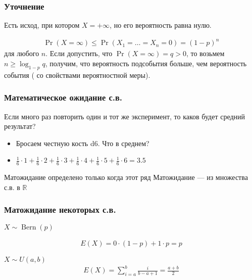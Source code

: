 \documentclass[hyperref=unicode,graphics=pdflatex,13pt,xcolor={usenames,dvipsnames}]{beamer}
\renewcommand\emph[1]{{\color{blue}{#1}}}
\newcommand\R{\mathbb{R}}
\DeclareMathOperator{\Bern}{Bern}
\begin{document}
\begin{frame}
  \frametitle{Уточнение}

  Есть исход, при котором $X = +\infty$, но его вероятность равна нулю.

  \begin{align*}
    \Pr(X = \infty) \le \Pr(X_1 = \dots = X_n = 0) = (1 - p)^n
  \end{align*}
  для любого $n$. Если допустить, что $\Pr(X = \infty) = q > 0$, то возьмем $n \ge \log_{1 - p} q$, получим, что вероятность подсобытия больше, чем вероятность события (\emph{Противоречие} со свойствами вероятностной меры).  
\end{frame}

\begin{frame}
  \frametitle{Математическое ожидание с.в.}

  Если много раз повторить один и тот же эксперимент, то каков будет средний результат?

  \begin{itemize}
    \item Бросаем честную кость d6. Что в среднем?
    \item $\frac{1}{6} \cdot 1 + \frac{1}{6} \cdot 2 + \frac{1}{6} \cdot 3 + \frac{1}{6} \cdot 4 + \frac{1}{6} \cdot 5 + \frac{1}{6} \cdot 6 = 3.5$
  \end{itemize}

  \pause

  \begin{center}
  \end{center}

  \pause
  \emph{NB:} Матожидание определено только когда этот ряд \emph{абсолютно сходится}
  \emph{NB-2:} Матожидание --- \emph{оператор} из множества с.в. в $\R$
\end{frame}

\begin{frame}
  \frametitle{Матожидание некоторых с.в.}

  $X \sim \Bern(p)$
  
  \begin{align*}
    E(X) = 0 \cdot (1 - p) + 1 \cdot p = p
  \end{align*}

  $X \sim U(a, b)$
  \begin{align*}
    E(X) = \sum_{i = a}^b \frac{i}{b - a + 1} = \frac{a + b}{2}
  \end{align*}  
\end{frame}
\end{document}
